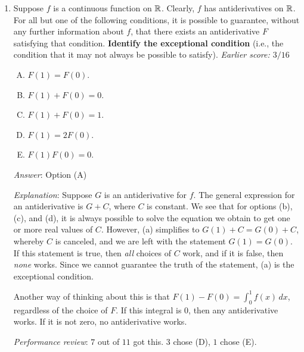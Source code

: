 \documentclass[10pt]{amsart}
\begin{document}
\begin{enumerate}
  {\em Action point}: This is a question you really {\em should} get
  correct!
\item Suppose $f$ is a continuous function on $\mathbb{R}$. Clearly, $f$ has
  antiderivatives on $\mathbb{R}$. For all but one of the following
  conditions, it is possible to guarantee, without any further
  information about $f$, that there exists an antiderivative $F$
  satisfying that condition. {\bf Identify the exceptional condition}
  (i.e., the condition that it may not always be possible to
  satisfy). {\em Earlier score: $3/16$}

  \begin{enumerate}[(A)]
  \item $F(1) = F(0)$.
  \item $F(1) + F(0) = 0$.
  \item $F(1) + F(0) = 1$.
  \item $F(1) = 2F(0)$.
  \item $F(1)F(0) = 0$.
  \end{enumerate}

  {\em Answer}: Option (A)

  {\em Explanation}: Suppose $G$ is an antiderivative for $f$. The
  general expression for an antiderivative is $G + C$, where $C$ is
  constant. We see that for options (b), (c), and (d), it is always
  possible to solve the equation we obtain to get one or more real
  values of $C$. However, (a) simplifies to $G(1) + C = G(0) + C$,
  whereby $C$ is canceled, and we are left with the statement $G(1) =
  G(0)$. If this statement is true, then {\em all} choices of $C$
  work, and if it is false, then {\em none} works. Since we cannot
  guarantee the truth of the statement, (a) is the exceptional
  condition.

  Another way of thinking about this is that $F(1) - F(0) = \int_0^1
  f(x) \, dx$, regardless of the choice of $F$. If this integral is
  $0$, then any antiderivative works. If it is not zero, no
  antiderivative works.

  {\em Performance review}: $7$ out of $11$ got this. $3$ chose (D),
  $1$ chose (E).


\end{enumerate}
\end{document}
